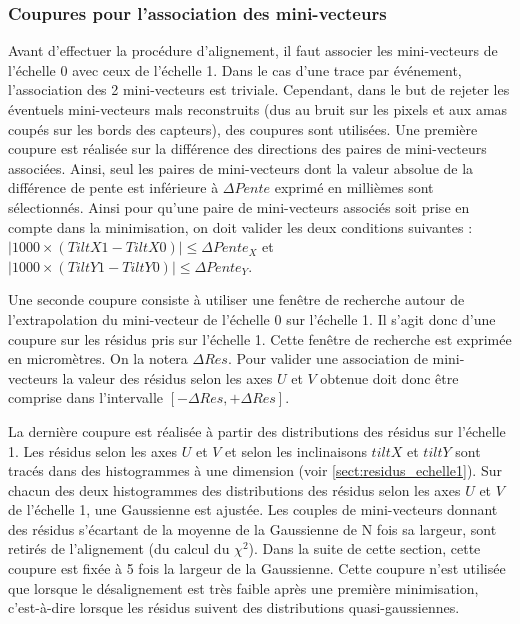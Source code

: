   \subsubsection{Coupures pour l'association des mini-vecteurs}
  
   Avant d'effectuer la proc\'edure d'alignement, il faut associer les mini-vecteurs de l'\'echelle 0 avec ceux de l'\'echelle 1. Dans le cas d'une trace par \'ev\'enement, l'association des 2 mini-vecteurs est triviale. Cependant, dans le but de rejeter les éventuels mini-vecteurs mals reconstruits (dus au bruit sur les pixels et aux amas coup\'es sur les bords des capteurs), des coupures sont utilis\'ees. Une premi\`ere coupure est r\'ealis\'ee sur la diff\'erence des directions des paires de mini-vecteurs associ\'ees. Ainsi, seul les paires de mini-vecteurs dont la valeur absolue de la diff\'erence de pente est inf\'erieure \`a $\Delta Pente$  exprim\'e en milli\`emes sont s\'electionn\'es. Ainsi pour qu'une paire de mini-vecteurs associ\'es soit prise en compte dans la minimisation, on doit valider les deux conditions suivantes : $\left| 1000 \times (TiltX1 - TiltX0) \right| \leq \Delta Pente_X$ et $\left| 1000 \times (TiltY1 - TiltY0) \right| \leq \Delta Pente_Y$.
   
   \medskip
   
   Une seconde coupure consiste \`a utiliser une fenêtre de recherche autour de l'extrapolation du mini-vecteur de l'\'echelle 0 sur l'\'echelle 1. Il s'agit donc d'une coupure sur les r\'esidus pris sur l'\'echelle 1. Cette fen\^etre de recherche est exprim\'ee en microm\`etres. On la notera $\Delta Res$. Pour valider une association de mini-vecteurs la valeur des r\'esidus selon les axes $U$ et $V$ obtenue doit donc \^etre comprise dans l'intervalle $[-\Delta Res, +\Delta Res]$.
   
   \medskip
   
   La derni\`ere coupure est r\'ealis\'ee \`a partir des distributions des r\'esidus sur l'\'echelle 1. Les r\'esidus selon les axes $U$ et $V$ et selon les inclinaisons $tiltX$ et $tiltY$ sont trac\'es dans des histogrammes \`a une dimension (voir \ref{sect:residus_echelle1}). Sur chacun des deux histogrammes des distributions des r\'esidus selon les axes $U$ et $V$ de l'\'echelle 1, une Gaussienne est ajust\'ee. Les couples de mini-vecteurs donnant des r\'esidus s'écartant de la moyenne de la Gaussienne de N fois sa largeur, sont retir\'es de l'alignement (du calcul du $\chi^2$). Dans la suite de cette section, cette coupure est fix\'ee \`a 5 fois la largeur de la Gaussienne. Cette coupure n'est utilis\'ee que lorsque le d\'esalignement est tr\`es faible apr\`es une premi\`ere minimisation, c'est-\`a-dire lorsque les r\'esidus suivent des distributions quasi-gaussiennes. 
 
